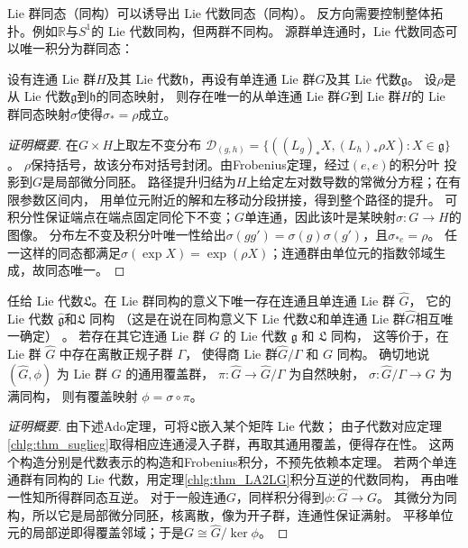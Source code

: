  Lie 群同态（同构）可以诱导出 Lie 代数同态（同构）。
反方向需要控制整体拓扑。例如$\mathbb R$与$S^1$的 Lie 代数同构，但两群不同构。
源群单连通时，Lie 代数同态可以唯一积分为群同态：
\begin{theorem}\label{chlg:thm_LA2LG}
    设有连通 Lie 群$H$及其 Lie 代数$\mathfrak{h}$，再设有单连通 Lie 群$G$及其 Lie 代数$\mathfrak{g}$。
    设$\rho$是从 Lie 代数$\mathfrak{g}$到$\mathfrak{h}$的同态映射，
    则存在唯一的从单连通 Lie 群$G$到 Lie 群$H$的 Lie 群同态映射$\sigma$使得$\sigma_{*}=\rho$成立。
\end{theorem}
\begin{proof}[证明概要]
在$G\times H$上取左不变分布
$\mathcal D_{(g,h)}=\{((L_g)_*X,(L_h)_*\rho X):X\in\mathfrak g\}$。
$\rho$保持括号，故该分布对括号封闭。由Frobenius定理，经过$(e,e)$的积分叶
投影到$G$是局部微分同胚。
路径提升归结为$H$上给定左对数导数的常微分方程；在有限参数区间内，
用单位元附近的解和左移动分段拼接，得到整个路径的提升。
可积分性保证端点在端点固定同伦下不变；$G$单连通，因此该叶是某映射$\sigma:G\to H$的图像。
分布左不变及积分叶唯一性给出$\sigma(gg')=\sigma(g)\sigma(g')$，且$\sigma_{*e}=\rho$。
任一这样的同态都满足$\sigma(\exp X)=\exp(\rho X)$；连通群由单位元的指数邻域生成，故同态唯一。
\end{proof}

\begin{theorem}
    任给 Lie 代数$\mathfrak{L}$。在 Lie 群同构的意义下唯一存在连通且单连通 Lie 群 $\widehat{G}$，
    它的 Lie 代数 $\widehat{\mathfrak{g}}$和$\mathfrak{L}$ 同构
    （这是在说在同构意义下 Lie 代数$\mathfrak{L}$和单连通 Lie 群$\widehat{G}$相互唯一确定）   。
    若存在其它连通 Lie 群 $G$ 的 Lie 代数 $\mathfrak{g}$ 和 $\mathfrak{L}$ 同构，
    这等价于，在 Lie 群 $\widehat{G}$ 中存在离散正规子群 $\Gamma$，
    使得商 Lie 群$\widehat{G} / \Gamma$ 和 $G$ 同构。
    确切地说$(\widehat{G}, \phi)$ 为 Lie 群 $G$ 的通用覆盖群，
    $\pi: \widehat{G} \rightarrow \widehat{G} / \Gamma $ 为自然映射，
    $\sigma: \widehat{G} / \Gamma \rightarrow G$ 为满同构，
    则有覆盖映射 $\phi=\sigma \circ \pi$。
\end{theorem}
\begin{proof}[证明概要]
由下述Ado定理，可将$\mathfrak L$嵌入某个矩阵 Lie 代数；
由子代数对应定理\ref{chlg:thm_suglieg}取得相应连通浸入子群，再取其通用覆盖，便得存在性。
这两个构造分别是代数表示的构造和Frobenius积分，不预先依赖本定理。
若两个单连通群有同构的 Lie 代数，用定理\ref{chlg:thm_LA2LG}积分互逆的代数同构，
再由唯一性知所得群同态互逆。
对于一般连通$G$，同样积分得到$\phi:\widehat G\to G$。
其微分为同构，所以它是局部微分同胚，核离散，像为开子群，连通性保证满射。
平移单位元的局部逆即得覆盖邻域；于是$G\cong\widehat G/\ker\phi$。
\end{proof}

